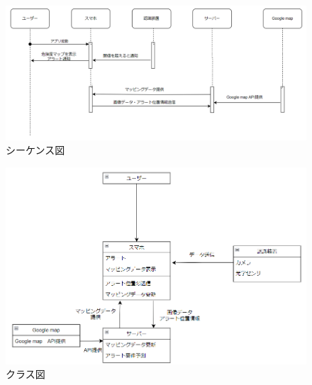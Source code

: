 \documentclass[titlepage,a4paper]{jsarticle}
\begin{document}
\begin{figure}[H]
  \centering
  \includegraphics[width=\textwidth]{img/sea_fig.png}
  \caption{シーケンス図}
  \label{シーケンス図}
\end{figure}

\begin{figure}[H]
  \centering
  \includegraphics[width=\textwidth]{img/class_fig.png}
  \caption{クラス図}
  \label{クラス図}
\end{figure}
\end{document}
